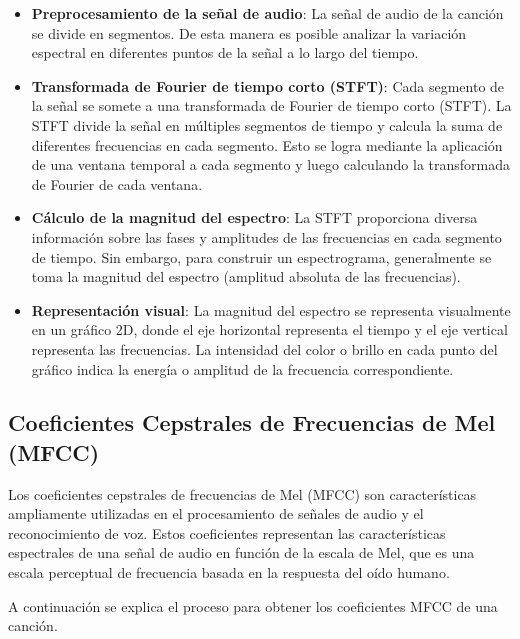 \begin{itemize}
\item \textbf{Preprocesamiento de la señal de audio}: La señal de audio de la canción se divide en segmentos. De esta manera es posible analizar la variación espectral en diferentes puntos de la señal a lo largo del tiempo.

\item \textbf{Transformada de Fourier de tiempo corto (STFT)}: Cada segmento de la señal se somete a una transformada de Fourier de tiempo corto (STFT). La STFT divide la señal en múltiples segmentos de tiempo y calcula la suma de diferentes frecuencias en cada segmento. 
Esto se logra mediante la aplicación de una ventana temporal a cada segmento y luego calculando la transformada de Fourier de cada ventana.

\item \textbf{Cálculo de la magnitud del espectro}: La STFT proporciona diversa información sobre las fases y amplitudes de las frecuencias en cada segmento de tiempo. Sin embargo, para construir un espectrograma, generalmente se toma la magnitud del espectro (amplitud absoluta de las frecuencias).

\item \textbf{Representación visual}: La magnitud del espectro se representa visualmente en un gráfico 2D, donde el eje horizontal representa el tiempo y el eje vertical representa las frecuencias. La intensidad del color o brillo en cada punto del gráfico indica la energía o amplitud de la frecuencia correspondiente.
\end{itemize}


\subsection{Coeﬁcientes Cepstrales de Frecuencias de Mel (MFCC)}
Los coeficientes cepstrales de frecuencias de Mel (MFCC) son características ampliamente utilizadas en el procesamiento de señales de audio y el reconocimiento de voz. 
Estos coeficientes representan las características espectrales de una señal de audio en función de la escala de Mel, que es una escala perceptual de frecuencia basada en la respuesta del oído humano.

A continuación se explica el proceso para obtener los coeficientes MFCC de una canción.

